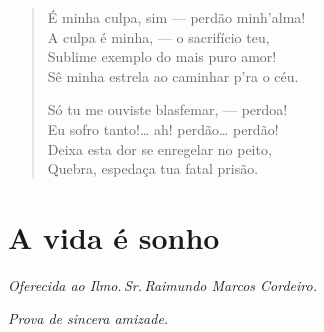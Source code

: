 \begin{verse}
É minha culpa, sim --- perdão minh'alma!\\
A culpa é minha, --- o sacrifício teu,\\
Sublime exemplo do mais puro amor!\\
Sê minha estrela ao caminhar p'ra o céu.

Só tu me ouviste blasfemar, --- perdoa!\\
Eu sofro tanto!\ldots{} ah! perdão\ldots{} perdão!\\
Deixa esta dor se enregelar no peito,\\
Quebra, espedaça tua fatal prisão.
\end{verse}

\chapter{A vida é sonho}

\hfill{}\emph{Oferecida ao Ilmo.\,Sr.\,Raimundo Marcos Cordeiro.}

\hfill{}\emph{Prova de sincera amizade.}

\medskip

